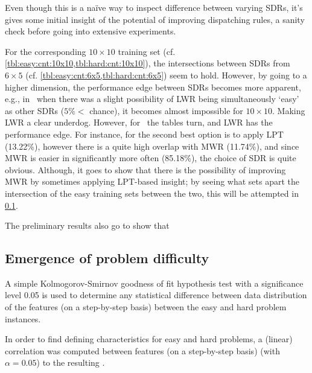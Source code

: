 Even though this is a na\"ive way to inspect difference between varying SDRs, it's gives some initial insight of the potential of improving dispatching rules, a sanity check before going into extensive experiments.

For the  corresponding $10\times10$ training set (cf. \cref{tbl:easy:cnt:10x10,tbl:hard:cnt:10x10}), the intersections between SDRs from $6\times5$ (cf. \cref{tbl:easy:cnt:6x5,tbl:hard:cnt:6x5}) seem to hold. However, by going to a higher dimension, the performance edge between SDRs becomes more apparent, e.g., in \JSP\ when there was a slight possibility of LWR being simultaneously `easy' as other SDRs ($5\%<$ chance), it becomes almost impossible for $10\times10$. Making LWR a clear underdog. However, for \FSP\ the tables turn, and LWR has the performance edge. For instance, for  the second  best option is to apply LPT (13.22\%), however there is a quite high overlap with MWR (11.74\%), and since MWR is easier in significantly more often (85.18\%), the choice of SDR is quite obvious. Although, it goes to show that there is the possibility of improving MWR by sometimes applying LPT-based insight; by seeing what sets apart the intersection of the easy training sets between the two, this will be attempted in \cref{sec:diff:stepwise}. 

The preliminary results also go to show that 



{\setlength{\tabcolsep}{3pt}






}







\subsection{Emergence of problem difficulty}\label{sec:diff:stepwise}
A simple Kolmogorov-Smirnov goodness of fit hypothesis test with a significance level 0.05 is used to determine any statistical difference between data distribution of the features (on a step-by-step basis) between the easy and hard problem instances.

In order to find defining characteristics for easy and hard problems, a (linear) correlation was computed between features (on a step-by-step basis) (with $\alpha=0.05$) to the resulting \namerho.

